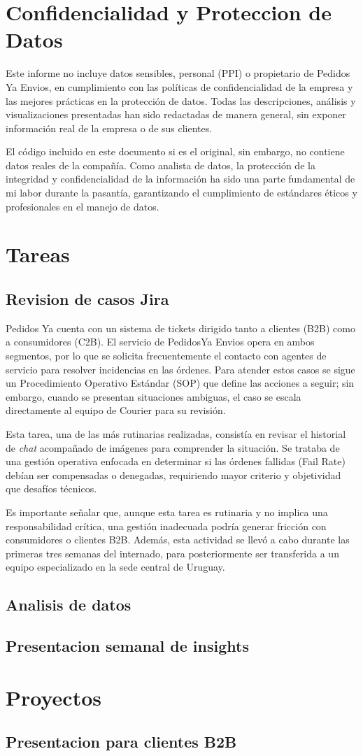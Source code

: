 \section*{Confidencialidad y Proteccion de Datos}
Este informe no incluye datos sensibles, personal (PPI) o propietario de Pedidos Ya Envios, en cumplimiento con las políticas de confidencialidad de la empresa y las mejores prácticas en la protección de datos. Todas las descripciones, análisis y visualizaciones presentadas han sido redactadas de manera general, sin exponer información real de la empresa o de sus clientes.

El código incluido en este documento si es el original, sin embargo, no contiene datos reales de la compañía. Como analista de datos, la protección de la integridad y confidencialidad de la información ha sido una parte fundamental de mi labor durante la pasantía, garantizando el cumplimiento de estándares éticos y profesionales en el manejo de datos.

\section{Tareas}
\subsection{Revision de casos Jira}
Pedidos Ya cuenta con un sistema de tickets dirigido tanto a clientes (B2B) como a consumidores (C2B). El servicio de PedidosYa Envios opera en ambos segmentos, por lo que se solicita frecuentemente el contacto con agentes de servicio para resolver incidencias en las órdenes. Para atender estos casos se sigue un Procedimiento Operativo Estándar (SOP) que define las acciones a seguir; sin embargo, cuando se presentan situaciones ambiguas, el caso se escala directamente al equipo de Courier para su revisión.

Esta tarea, una de las más rutinarias realizadas, consistía en revisar el historial de \textit{chat} acompañado de imágenes para comprender la situación. Se trataba de una gestión operativa enfocada en determinar si las órdenes fallidas (Fail Rate) debían ser compensadas o denegadas, requiriendo mayor criterio y objetividad que desafíos técnicos.

Es importante señalar que, aunque esta tarea es rutinaria y no implica una responsabilidad crítica, una gestión inadecuada podría generar fricción con consumidores o clientes B2B. Además, esta actividad se llevó a cabo durante las primeras tres semanas del internado, para posteriormente ser transferida a un equipo especializado en la sede central de Uruguay.

\subsection{Analisis de datos}
\subsection{Presentacion semanal de insights}
\section{Proyectos}
\subsection{Presentacion para clientes B2B}

